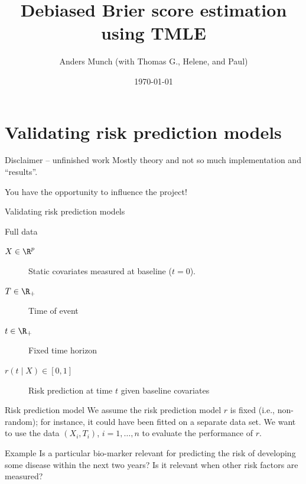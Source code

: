 \documentclass[smaller]{beamer}\usepackage{listings}
\author{Anders Munch (with Thomas G., Helene, and Paul)}
\date{\today}
\title{Debiased Brier score estimation using TMLE}
\begin{document}
\maketitle
\section{Validating risk prediction models}
\label{sec:org2f8e765}
\begin{frame}[label={sec:org9520722}]{Disclaimer -- unfinished work}
Mostly theory and not so much implementation and ``results''.

\vfill \pause

You have the opportunity to influence the project!
\end{frame}

\begin{frame}[label={sec:org2a585bb}]{Validating risk prediction models}
\begin{block}{Full data}
\begin{description}
\item[{\(X \in \R^p\)}] Static covariates measured at baseline (\(t=0\)).

\item[{\(T \in \R_+\)}] Time of event

\item[{\(t \in \R_+\)}] Fixed time horizon

\item[{\(r(t \mid X) \in [0,1]\)}] Risk prediction at time \(t\) given baseline covariates
\end{description}

\pause     
\end{block}
\begin{block}{Risk prediction model}
We assume the risk prediction model \(r\) is fixed (i.e., non-random); for instance, it could have
been fitted on a separate data set. We want to use the data \((X_i, T_i)\), \(i=1,\dots,n\) to
evaluate the performance of \(r\). \pause
\end{block}
\begin{block}{Example}
Is a particular bio-marker relevant for predicting the risk of developing some disease within
the next two years? Is it relevant when other risk factors are measured?
\end{block}
\end{frame}
\end{document}
